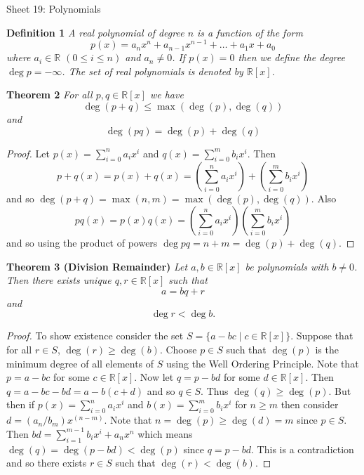 \documentclass{article}
\begin{document}
\begin{flushleft}

\Large

Sheet 19: Polynomials\newline

\normalsize

\textbf{Definition 1}
\textsl{A real polynomial of degree $n$ is a function of the form
\[
p(x) = a_n x^n + a_{n-1} x^{n-1} + \dots + a_1 x + a_0
\]
where $a_i \in \mathbb{R}$ $(0 \leq i \leq n)$ and $a_n \neq 0$. If $p(x) = 0$ then we define the degree $\deg p = - \infty$. The set of real polynomials is denoted by $\mathbb{R}[x]$.}\newline

\textbf{Theorem 2}
\textsl{For all $p,q \in \mathbb{R}[x]$ we have
\[
\deg(p+q) \leq \max(\deg(p), \deg(q))
\]
and
\[
\deg(pq) = \deg(p) + \deg(q)
\]}
\begin{proof}
Let $p(x) = \sum_{i=0}^n a_i x^i$ and $q(x) = \sum_{i=0}^m b_i x^i$. Then
\[
p+q(x) = p(x) + q(x) = \left ( \sum_{i=0}^n a_i x^i \right ) + \left ( \sum_{i=0}^m b_i x^i \right )
\]
and so $\deg(p+q) = \max(n,m) = \max(\deg(p), \deg(q))$. Also
\[
pq(x) = p(x)q(x) = \left ( \sum_{i=0}^n a_i x^i \right ) \left ( \sum_{i=0}^m b_i x^i \right )
\]
and so using the product of powers $\deg pq = n+m = \deg(p) + \deg(q)$.
\end{proof}

\textbf{Theorem 3 (Division Remainder)}
\textsl{Let $a,b \in \mathbb{R}[x]$ be polynomials with $b \neq 0$. Then there exists unique $q,r \in \mathbb{R}[x]$ such that
\[
a = bq + r
\]
and
\[
\deg r < \deg b.
\]}
\begin{proof}
To show existence consider the set $S = \{a-bc \mid c \in \mathbb{R}[x]\}$. Suppose that for all $r \in S$, $\deg(r) \geq \deg(b)$. Choose $p \in S$ such that $\deg(p)$ is the minimum degree of all elements of $S$ using the Well Ordering Principle. Note that $p=a-bc$ for some $c \in \mathbb{R}[x]$. Now let $q = p-bd$ for some $d \in \mathbb{R}[x]$. Then $q = a-bc-bd=a-b(c+d)$ and so $q \in S$. Thus $\deg(q) \geq \deg(p)$. But then if $p(x) = \sum_{i=0}^n a_i x^i$ and $b(x) = \sum_{i=0}^m b_i x^i$ for $n \geq m$ then consider $d = (a_n/b_m) x^{(n-m)}$. Note that $n = \deg(p) \geq \deg(d) = m$ since $p \in S$. Then $bd = \sum_{i=1}^{m-1} b_i x^i + a_n x^n$ which means $\deg(q) = \deg(p-bd) < \deg(p)$ since $q = p-bd$. This is a contradiction and so there exists $r \in S$ such that $\deg(r) < \deg(b)$.\newline


\end{proof}
\end{flushleft}
\end{document}
